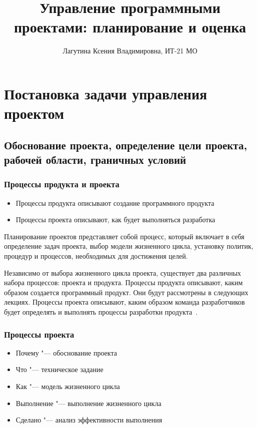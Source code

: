 \documentclass{../industrial-development}
\title{Управление программными проектами: планирование и оценка}
\author{Лагутина Ксения Владимировна, ИТ-21 МО}
\date{}
\begin{document}
\begin{frame}
  \titlepage
\end{frame}

\section{Постановка задачи управления проектом}

\subsection{Обоснование проекта, определение цели проекта, рабочей области, граничных условий}

\begin{frame} \frametitle{Процессы продукта и проекта}
  \begin{itemize}
   \item Процессы продукта описывают создание программного продукта
   \item Процессы проекта описывают, как будет выполняться разработка
  \end{itemize}
\end{frame}

\lecturenotes

Планирование проектов представляет собой процесс, который включает в себя определение задач проекта, выбор модели жизненного цикла, установку политик, процедур и процессов, необходимых для достижения целей.

Независимо от выбора жизненного цикла проекта, существует два различных набора процессов: проекта и продукта. Процессы продукта описывают, каким образом создается программный продукт. Они будут рассмотрены в следующих лекциях. Процессы проекта описывают, каким образом команда разработчиков будет определять и выполнять процессы разработки продукта~\cite[с.~241--242]{Fatrell}.

\begin{frame} \frametitle{Процессы проекта}
  \begin{itemize}
   \item Почему "--- обоснование проекта
   \item Что "--- техническое задание
   \item Как "--- модель жизненного цикла
   \item Выполнение "--- выполнение жизненного цикла
   \item Сделано "--- анализ эффективности выполнения
  \end{itemize}
\end{frame}
\end{document}
